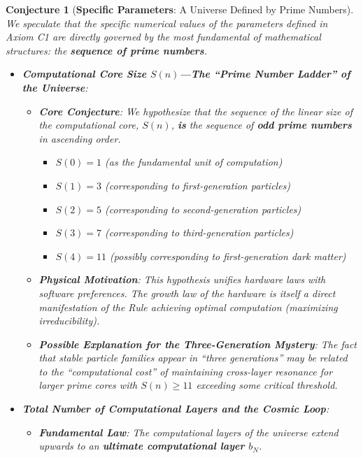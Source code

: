 \documentclass[11pt, a4paper]{article}
\newtheorem{conjecture}{Conjecture}[section] %
\begin{document}
\begin{conjecture}[\textbf{Specific Parameters}: A Universe Defined by Prime Numbers]
We speculate that the specific numerical values of the parameters defined in Axiom C1 are directly governed by the most fundamental of mathematical structures: the \textbf{sequence of prime numbers}.
\begin{itemize}
    \item \textbf{Computational Core Size $S(n)$—The ``Prime Number Ladder'' of the Universe}:
    \begin{itemize}
        \item \textbf{Core Conjecture}: We hypothesize that the sequence of the linear size of the computational core, $S(n)$, \textbf{is} the sequence of \textbf{odd prime numbers} in ascending order.
            \begin{itemize}
                \item $S(0) = 1$ (as the fundamental unit of computation)
                \item $S(1) = 3$ (corresponding to first-generation particles)
                \item $S(2) = 5$ (corresponding to second-generation particles)
                \item $S(3) = 7$ (corresponding to third-generation particles)
                \item $S(4) = 11$ (possibly corresponding to first-generation dark matter)
            \end{itemize}
        \item \textbf{Physical Motivation}: This hypothesis unifies hardware laws with software preferences. The growth law of the hardware is itself a direct manifestation of the Rule achieving optimal computation (maximizing irreducibility).
        \item \textbf{Possible Explanation for the Three-Generation Mystery}: The fact that stable particle families appear in ``three generations'' may be related to the ``computational cost'' of maintaining cross-layer resonance for larger prime cores with $S(n) \ge 11$ exceeding some critical threshold.
    \end{itemize}
    \item \textbf{Total Number of Computational Layers and the Cosmic Loop}:
    \begin{itemize}
        \item \textbf{Fundamental Law}: The computational layers of the universe extend upwards to an \textbf{ultimate computational layer $b_N$}.

\end{itemize}
\end{itemize}
\end{conjecture}
\end{document}
